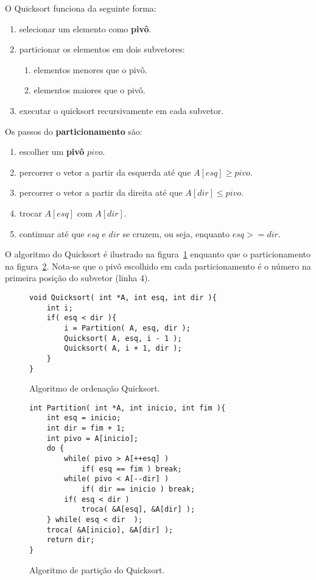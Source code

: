 O Quicksort funciona da seguinte forma:
\begin{enumerate}
\item selecionar um elemento como {\bf pivô}.
\item particionar os elementos em dois subvetores:
	\begin{enumerate}
	\item elementos menores que o pivô.
	\item elementos maiores que o pivô.
	\end{enumerate}
\item executar o quicksort recursivamente em cada subvetor.
\end{enumerate}

Os passos do {\bf particionamento} são:
\begin{enumerate}
\item escolher um {\bf pivô} $pivo$.
\item percorrer o vetor a partir da esquerda até que $A[esq] \geq pivo$.
\item percorrer o vetor a partir da direita até que $A[dir] \leq pivo$.
\item trocar $A[esq]$ com $A[dir]$.
\item continuar até que $esq$ e $dir$ se cruzem, ou seja, enquanto $esq >= dir$.
\end{enumerate}


O algoritmo do Quicksort é ilustrado na figura~\ref{aula03:algo:quicksort}
enquanto que o particionamento na figura~\ref{aula03:algo:partition}.
Nota-se que o pivô escolhido em cada particionamento é o número 
na primeira posição do subvetor (linha 4).
%
\begin{figure}[!htb]
\centering
\begin{framed}
\begin{lstlisting}
void Quicksort( int *A, int esq, int dir ){
	int i;
	if( esq < dir ){
		i = Partition( A, esq, dir );
		Quicksort( A, esq, i - 1 );
		Quicksort( A, i + 1, dir );
	}
}
\end{lstlisting}
\end{framed}
\caption{Algoritmo de ordenação Quicksort.}
\label{aula03:algo:quicksort}
\end{figure}

\begin{figure}[!htb]
\centering
\begin{framed}
\begin{lstlisting}
int Partition( int *A, int inicio, int fim ){
	int esq = inicio;
	int dir = fim + 1;
	int pivo = A[inicio];
	do {
		while( pivo > A[++esq] )
			if( esq == fim ) break;
		while( pivo < A[--dir] )
			if( dir == inicio ) break;
		if( esq < dir )
			troca( &A[esq], &A[dir] );
	} while( esq < dir  );
	troca( &A[inicio], &A[dir] );
	return dir;
}
\end{lstlisting}
\end{framed}
\caption{Algoritmo de partição do Quicksort.}
\label{aula03:algo:partition}
\end{figure}

